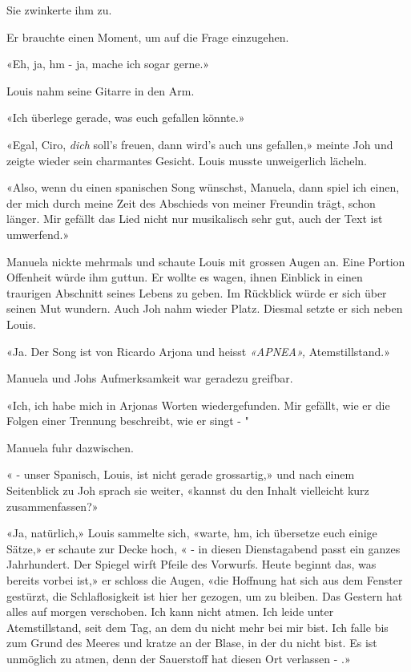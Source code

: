 Sie zwinkerte ihm zu.

Er brauchte einen Moment, um auf die Frage einzugehen. 

«Eh, ja, hm -  ja, mache ich sogar gerne.»

Louis nahm seine Gitarre in den Arm.

«Ich überlege gerade, was euch gefallen könnte.»

«Egal, Ciro, \emph{dich} soll’s freuen, dann wird’s auch uns gefallen,»
meinte Joh und zeigte wieder sein charmantes Gesicht. Louis musste
unweigerlich lächeln.

«Also, wenn du einen spanischen Song wünschst, Manuela, dann spiel ich
einen, der mich durch meine Zeit des Abschieds von meiner Freundin
trägt, schon länger. Mir gefällt das Lied nicht nur musikalisch sehr
gut, auch der Text ist umwerfend.»

Manuela nickte mehrmals und schaute Louis mit grossen Augen an.
Eine Portion Offenheit würde ihm guttun. Er wollte es wagen, ihnen Einblick in einen traurigen Abschnitt seines
Lebens zu geben. Im Rückblick würde er sich über seinen Mut wundern.
Auch Joh nahm wieder Platz. Diesmal setzte er sich neben Louis. 

«Ja. Der Song ist von Ricardo Arjona und heisst 
\emph{«APNEA»,} Atemstillstand.»

Manuela und Johs  Aufmerksamkeit war geradezu greifbar. 

«Ich, ich habe mich in Arjonas Worten wiedergefunden. Mir gefällt, wie er die Folgen einer Trennung beschreibt, wie er singt - "

Manuela fuhr dazwischen.

« - unser Spanisch, Louis, ist nicht gerade grossartig,» und nach einem Seitenblick zu Joh sprach sie weiter, «kannst du den Inhalt vielleicht kurz zusammenfassen?»

«Ja, natürlich,» Louis sammelte sich, «warte, hm, ich übersetze euch einige Sätze,» er schaute zur Decke hoch, « - in diesen Dienstagabend passt ein ganzes Jahrhundert. Der Spiegel wirft Pfeile des Vorwurfs. Heute beginnt das, was bereits vorbei ist,» er schloss die Augen, «die Hoffnung hat sich aus dem Fenster gestürzt, die Schlaflosigkeit ist hier her gezogen, um zu bleiben. Das Gestern hat alles auf morgen verschoben. Ich kann nicht atmen. Ich leide unter Atemstillstand, seit dem Tag, an dem du nicht mehr bei mir bist. Ich falle bis zum Grund des Meeres und kratze an der Blase, in der du nicht bist. Es ist unmöglich zu atmen, denn der Sauerstoff hat diesen Ort verlassen - .»


